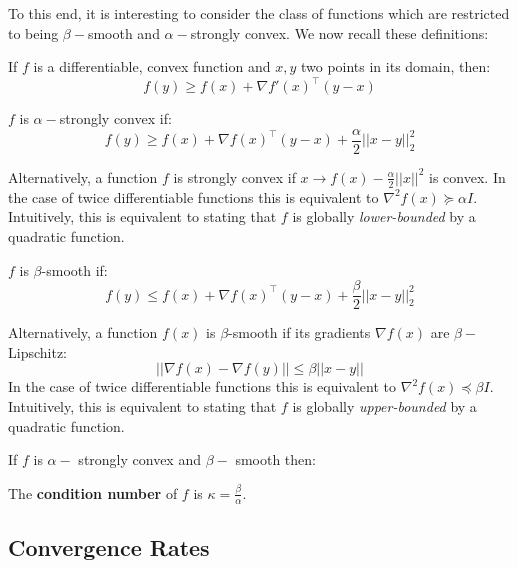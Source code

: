 To this end, it is interesting to consider the class of functions which are restricted to being $\beta-$smooth and $\alpha-$strongly convex. 
We now recall these definitions:
\begin{definition}
If $f$ is a differentiable, convex function and $x,y$ two points in its domain, then:
\begin{equation}\label{convexity_def_eq}
f(y) \geq f(x) + \nabla f'(x)^\top (y-x)
\end{equation}
\end{definition}

\begin{definition}
$f$ is $\alpha-$strongly convex if:
\begin{equation}
f(y) \geq f(x) + \nabla f(x)^\top(y-x) + \frac{\alpha}{2} ||x - y||_2^2
\end{equation}
\end{definition}

Alternatively, a function $f$ is strongly convex if $x \rightarrow f(x) - \frac{\alpha}{2} ||x||^2$ is convex. In the case of twice differentiable functions this is equivalent to $\nabla^{2} f(x) \succeq \alpha I$. Intuitively, this is equivalent to stating that $f$ is globally \textit{lower-bounded} by a quadratic function. 

\begin{definition}
$f$ is $\beta$-smooth if:
\begin{equation}\label{fundamental_beta_eq}
f(y) \leq f(x) + \nabla f(x)^\top(y-x)+ \frac{\beta}{2} ||x - y||_2^2
\end{equation}
\end{definition}
Alternatively, a function $f(x)$ is $\beta$-smooth if its gradients $\nabla f(x)$ are $\beta-$Lipschitz:
\begin{equation}
    || \nabla f(x) - \nabla f(y) || \leq \beta ||x - y||
\end{equation}
In the case of twice differentiable functions this is equivalent to $\nabla^{2} f(x) \preceq \beta I$.
Intuitively, this is equivalent to stating that $f$ is globally \textit{upper-bounded} by a quadratic function.

If $f$ is $\alpha-$ strongly convex and $\beta-$ smooth then:
\begin{definition}
The \textbf{condition number} of $f$ is $\kappa = \frac{\beta}{\alpha}$. 
\end{definition}

\subsection{Convergence Rates}

